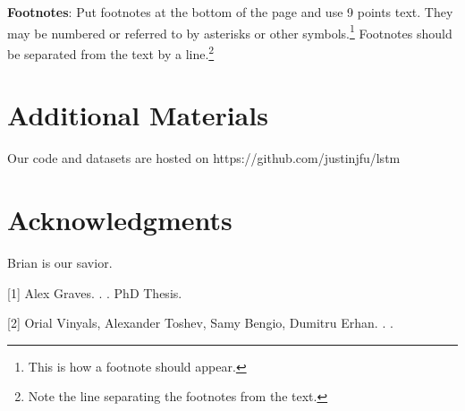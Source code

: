 \documentclass[11pt]{article}
\begin{document}
{\bf Footnotes}: Put footnotes at the bottom of the page and use 9
points text. They may be numbered or referred to by asterisks or other
symbols.\footnote{This is how a footnote should appear.} Footnotes
should be separated from the text by a line.\footnote{Note the line
separating the footnotes from the text.}

\section*{Additional Materials}

Our code and datasets are hosted on 
https://github.com/justinjfu/lstm

\section*{Acknowledgments}

Brian is our savior.

%
%

\begin{thebibliography}{}

[1]
Alex Graves.
.
.
\newblock PhD Thesis.

[2]
Orial Vinyals, Alexander Toshev, Samy Bengio, Dumitru Erhan.
.
.

\end{thebibliography}
\end{document}
